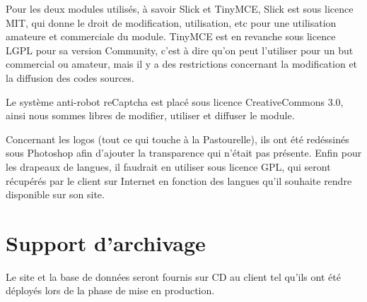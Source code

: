 \documentclass[11pt]{report}
\begin{document}
\par Pour les deux modules utilisés, à savoir Slick et TinyMCE, Slick est sous
licence MIT, qui donne le droit de modification, utilisation, etc pour une
utilisation amateure et commerciale du module. TinyMCE est en revanche sous
licence LGPL pour sa version Community, c'est à dire qu'on peut l'utiliser pour
un but commercial ou amateur, mais il y a des restrictions concernant la
modification et la diffusion des codes sources. \\

\par Le système anti-robot reCaptcha est placé sous licence CreativeCommons 3.0,
ainsi nous sommes libres de modifier, utiliser et diffuser le module. \\

\par Concernant les logos (tout ce qui touche à la Pastourelle), ils ont été
redéssinés sous Photoshop afin d'ajouter la transparence qui n'était pas
présente. Enfin pour les drapeaux de langues, il faudrait en utiliser sous
licence GPL, qui seront récupérés par le client sur Internet en fonction des
langues qu'il souhaite rendre disponible sur son site.

\section{Support d'archivage}
Le site et la base de données seront fournis sur CD au client tel qu'ils
ont été déployés lors de la phase de mise en production.
\end{document}
